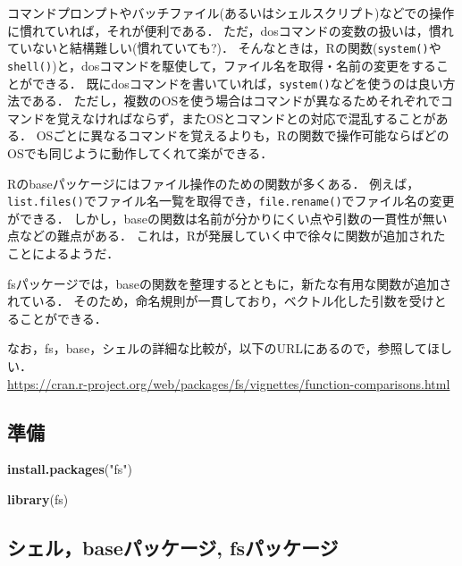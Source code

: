 \documentclass[
]{article}
\newenvironment{Shaded}{\begin{snugshade}}{\end{snugshade}}
\newcommand{\FunctionTok}[1]{\textcolor[rgb]{0.13,0.29,0.53}{\textbf{#1}}}
\newcommand{\NormalTok}[1]{#1}
\newcommand{\StringTok}[1]{\textcolor[rgb]{0.31,0.60,0.02}{#1}}
\begin{document}
コマンドプロンプトやバッチファイル(あるいはシェルスクリプト)などでの操作に慣れていれば，それが便利である．
ただ，dosコマンドの変数の扱いは，慣れていないと結構難しい(慣れていても?)．
そんなときは，Rの関数(\texttt{system()}や\texttt{shell()})と，dosコマンドを駆使して，ファイル名を取得・名前の変更をすることができる．
既にdosコマンドを書いていれば，\texttt{system()}などを使うのは良い方法である．
ただし，複数のOSを使う場合はコマンドが異なるためそれぞれでコマンドを覚えなければならず，またOSとコマンドとの対応で混乱することがある．
OSごとに異なるコマンドを覚えるよりも，Rの関数で操作可能ならばどのOSでも同じように動作してくれて楽ができる．

Rのbaseパッケージにはファイル操作のための関数が多くある．
例えば，\texttt{list.files()}でファイル名一覧を取得でき，\texttt{file.rename()}でファイル名の変更ができる．
しかし，baseの関数は名前が分かりにくい点や引数の一貫性が無い点などの難点がある．
これは，Rが発展していく中で徐々に関数が追加されたことによるようだ．

fsパッケージでは，baseの関数を整理するとともに，新たな有用な関数が追加されている．
そのため，命名規則が一貫しており，ベクトル化した引数を受けとることができる．

なお，fs，base，シェルの詳細な比較が，以下のURLにあるので，参照してほしい．\\
\url{https://cran.r-project.org/web/packages/fs/vignettes/function-comparisons.html}

\hypertarget{ux6e96ux5099-4}{%
\subsection{準備}\label{ux6e96ux5099-4}}

\begin{Shaded}
\begin{Highlighting}[]
\FunctionTok{install.packages}\NormalTok{(}\StringTok{"fs"}\NormalTok{)}
\end{Highlighting}
\end{Shaded}

\begin{Shaded}
\begin{Highlighting}[]
\FunctionTok{library}\NormalTok{(fs)}
\end{Highlighting}
\end{Shaded}

\hypertarget{ux30b7ux30a7ux30ebbaseux30d1ux30c3ux30b1ux30fcux30b8-fsux30d1ux30c3ux30b1ux30fcux30b8}{%
\subsection{シェル，baseパッケージ, fsパッケージ}\label{ux30b7ux30a7ux30ebbaseux30d1ux30c3ux30b1ux30fcux30b8-fsux30d1ux30c3ux30b1ux30fcux30b8}}
\end{document}
